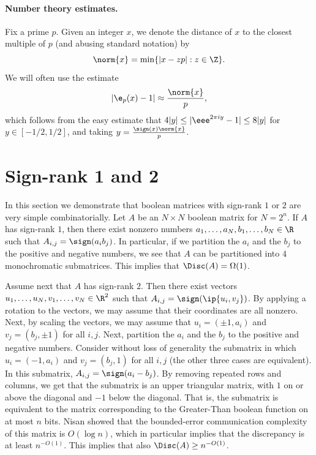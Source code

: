 \paragraph{Number theory estimates.} Fix a prime $p$.
Given an integer $x$, we denote the distance of $x$ to the closest multiple of $p$ (and abusing standard notation) by
$$\norm{x} = \min\{| x - zp |: z\in \Z\}.$$
We will often use the estimate
$$   |\e_p(x)-1|  \approx   \frac{\norm{x}}{p}, $$
which follows from the easy estimate that $4 |y| \le |\eee^{2 \pi i y} - 1| \le 8|y|$ for  $y \in [-1/2,1/2]$, and taking $y = \frac{\sign(x)\norm{x}}{p}$.


\section{ Sign-rank 1 and 2}\label{sec:signrank12}
In this section we demonstrate that boolean matrices with sign-rank $1$ or $2$ are very simple combinatorially. Let $A$ be an $N \times N$ boolean matrix
for $N=2^n$.
If $A$ has sign-rank $1$, then there exist nonzero numbers $a_1,\ldots,a_N, b_1,\ldots,b_N \in \R$ such that $A_{i,j} = \sign(a_i b_j)$. In particular,
if we partition the $a_i$ and the $b_j$ to the positive and negative numbers, we see that $A$ can be partitioned into $4$ monochromatic submatrices. This implies that $\Disc(A) = \Omega(1)$.

Assume next that $A$ has sign-rank $2$. Then there exist vectors $u_1,\ldots,u_N, v_1,\ldots,v_N  \in \R^2$ such that $A_{i,j} = \sign(\ip{u_i,v_j})$.
By applying a rotation to the vectors, we may assume that their coordinates are all nonzero. Next, by scaling the vectors, we may assume that $u_i=(\pm 1,a_i)$ and $v_j = (b_j, \pm 1)$ for all $i,j$.
Next, partition the $a_i$ and the $b_j$ to the positive and negative numbers. Consider without loss of generality the submatrix in which $u_i=(-1,a_i)$ and $v_j = (b_j, 1)$ for all $i,j$ (the other three cases are equivalent). In this submatrix, $A_{i,j} = \sign(a_i - b_j)$. By removing repeated rows and columns, we get that the submatrix is an upper triangular matrix, with $1$ on or above the diagonal and $-1$ below the diagonal. That is, the submatrix is equivalent to the matrix corresponding to the Greater-Than boolean function on at most $n$ bits.
Nisan \cite{nisan1993communication} showed that the bounded-error communication complexity of this matrix is $O(\log n)$, which in particular implies that the discrepancy is at least $n^{-O(1)}$. This implies that also $\Disc(A) \ge n^{-O(1)}$.

